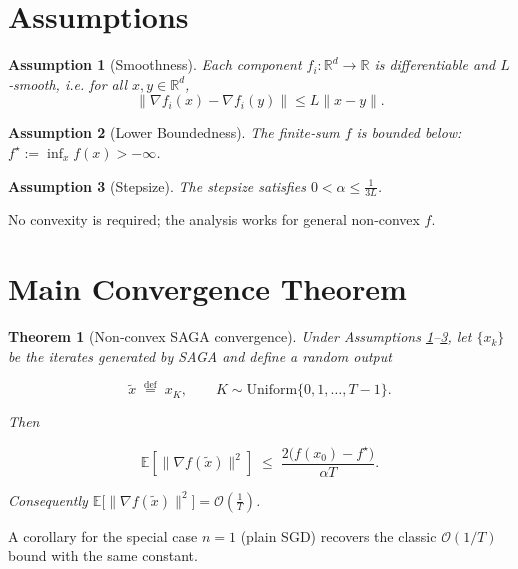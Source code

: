 \documentclass{article}
\newtheorem{theorem}{Theorem}
\newtheorem{assumption}{Assumption}
\begin{document}
\section*{Assumptions}
\begin{assumption}[Smoothness]\label{ass:smooth}
Each component $f_i:\mathbb{R}^{d}\to\mathbb{R}$ is differentiable and $L$‑smooth,
i.e. for all $x,y\in\mathbb{R}^{d}$,
\[
\|\nabla f_i(x)-\nabla f_i(y)\|\le L\|x-y\|.
\tag{6}
\]
\end{assumption}
\begin{assumption}[Lower Boundedness]\label{ass:lb}
The finite‑sum $f$ is bounded below: $\displaystyle f^{\star}:=\inf_{x}f(x)>-\infty$.
\end{assumption}
\begin{assumption}[Stepsize]\label{ass:stepsize}
The stepsize satisfies $0<\alpha\le \frac{1}{3L}$.
\end{assumption}
No convexity is required; the analysis works for general non‑convex $f$.

\section*{Main Convergence Theorem}
\begin{theorem}[Non‑convex SAGA convergence]\label{thm:main}
Under Assumptions \ref{ass:smooth}–\ref{ass:stepsize}, let $\{x_k\}$ be the iterates generated by SAGA and define a random output  

\[
\tilde x \;\stackrel{\text{def}}{=}\; x_{K},\qquad 
K\sim \text{Uniform}\{0,1,\dots ,T-1\}.
\]

Then  

\[
\mathbb{E}\!\left[\big\|\nabla f(\tilde x)\big\|^{2}\right]
\;\le\;
\frac{2\big(f(x_0)-f^{\star}\big)}{\alpha T}.
\tag{7}
\]

Consequently $\displaystyle \mathbb{E}\big[\|\nabla f(\tilde x)\|^{2}\big]=\mathcal{O}\!\left(\frac1T\right)$.
\end{theorem}

A corollary for the special case $n=1$ (plain SGD) recovers the classic $\mathcal{O}(1/T)$ bound with the same constant.

\end{document}
